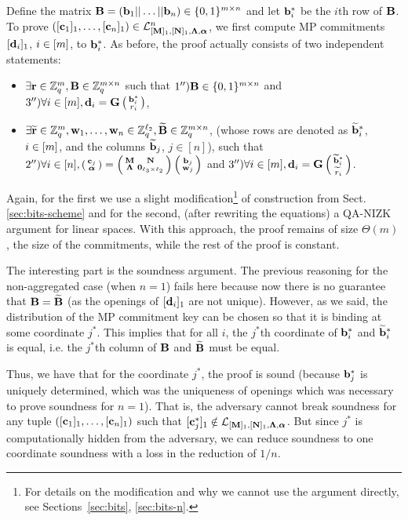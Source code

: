 Define the matrix $\mathbf{{B}}=(\mathbf{b}_1|| \ldots || \mathbf{b}_n) \in \{0,1\}^{{m} \times n}$ and let $\mathbf{b}_i^*$ be the $i$th row of $\mathbf{{B}}$. To prove $([\mathbf{c}_1]_1,\ldots, [\mathbf{c}_n]_1) \in\mathcal{L}_{[\mathbf{{M}}]_1,[\mathbf{{N}}]_1,\mathbf{{\Lambda}},{\boldsymbol \alpha}}^n$, we first compute MP commitments $[\mathbf{d}_i]_1$, $i \in [{m}]$, to $\mathbf{b}_i^*$.  As before, 
the proof actually consists of two independent statements:
\begin{itemize}
\item $\exists \mathbf{r} \in \mathbb{Z}_q^{m}, \mathbf{{B}} \in \mathbb{Z}_q^{{m} \times n}$ such that  
$1'') \mathbf{{B}} \in \{0,1\}^{{m} \times n}$ and $3'') \forall i \in [m], \mathbf{d}_i=\mathbf{{G}}\left(\begin{smallmatrix}\mathbf{b}_i^*  \\ r_i\end{smallmatrix}\right)$,
\item $\exists \widetilde{\mathbf{r}}\in\mathbb{Z}_q^{m}, \mathbf{w}_1,\ldots,\mathbf{w}_n \in\mathbb{Z}_q^{\ell_2}, \widetilde{\mathbf{{B}}} \in \mathbb{Z}_q^{{m} \times n}$, (whose rows are denoted as $\widetilde{\mathbf{b}}_i^*$, $i \in [{m}]$, and the columns $\widetilde{\mathbf{b}}_j$, $j \in [n]$), such that  
   $2'')\forall i\in[n], \left(\begin{smallmatrix}
    \mathbf{c}_j\\
    {\boldsymbol \alpha}
\end{smallmatrix}\right)
=
\left(\begin{smallmatrix}
    \mathbf{{M}}       & \mathbf{{N}}\\
    \mathbf{{\Lambda}} & \mathbf{{0}}_{{\ell_3}\times {\ell_2}}
\end{smallmatrix}\right)
\left(\begin{smallmatrix}
    \mathbf{b}_j\\
    \mathbf{w}_j
\end{smallmatrix}\right)$ and $3'') \forall i \in [{m}], \mathbf{d}_i=\mathbf{{G}}   \left(\begin{smallmatrix}\widetilde{\mathbf{b}}^*_i  \\ \widetilde{r}_i\end{smallmatrix}\right)$.
\end{itemize}
Again, for the first we use a slight modification\footnote{For details on the modification and why we cannot use the argument directly, see Sections~\ref{sec:bits}, \ref{sec:bits-n}.} of construction from Sect. \ref{sec:bits-scheme} and for the second, (after rewriting the equations) a QA-NIZK argument for linear spaces. With this approach, the proof remains of size $\Theta(m)$, the size of the commitments, while the rest of the proof is constant. 

The interesting part is the soundness argument. The previous reasoning for the non-aggregated case (when $n=1$) fails here because now there is no guarantee that 
 $\mathbf{{B}}=\widetilde{\mathbf{{B}}}$ (as the openings of $[\mathbf{d}_i]_1$ are not unique).  However, as we said, the distribution of the MP commitment key can be chosen so that it is binding at some coordinate $j^*$. This implies that for all $i$, the $j^*$th coordinate of $\mathbf{b}_i^*$ and $\widetilde{\mathbf{b}}_i^*$ is equal, i.e. the $j^*$th column of $\mathbf{{B}}$ and $\widetilde{\mathbf{{B}}}$ must be equal.  

Thus, we have that for the coordinate $j^*$, the proof is sound (because $\mathbf{b}_j^*$ is uniquely determined, which was the uniqueness of openings which was necessary to prove soundness for $n=1$). That is, the adversary cannot break soundness for any tuple $([\mathbf{c}_1]_1,\ldots, [\mathbf{c}_n]_1)$ such that $[\mathbf{c}_j^*]_1 \notin \mathcal{L}_{[\mathbf{{M}}]_1,[\mathbf{{N}}]_1,\mathbf{{\Lambda}},{\boldsymbol \alpha}}$. But since $j^*$ is computationally hidden 
from the adversary, we can reduce soundness to one coordinate soundness with a loss in the reduction of $1/n$. 

